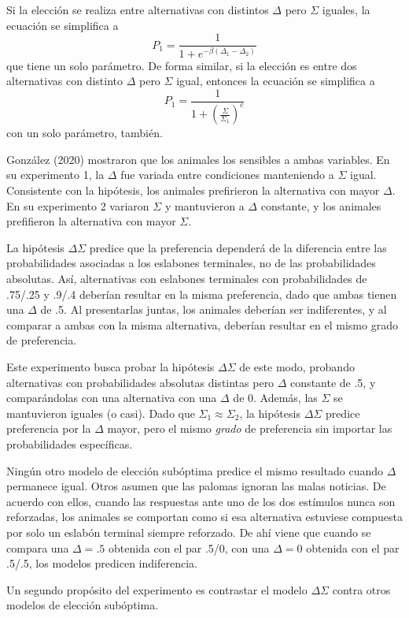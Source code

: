 \documentclass[a4paper,12pt]{article}
\begin{document}
Si la elección se realiza entre alternativas con distintos $\Delta$ pero $\Sigma$ iguales, la ecuación se simplifica a
$$P_1=\frac{1}{1+e^{-\beta(\Delta_1-\Delta_2)}}$$
que tiene un solo parámetro. De forma similar, si la elección es entre dos alternativas con distinto $\Delta$ pero $\Sigma$ igual, entonces la ecuación se simplifica a
$$P_1=\frac{1}{1+\left(\frac{\Sigma}{\Sigma_1}\right)^c}$$
con un solo parámetro, también.

González (2020) mostraron que los animales los sensibles a ambas variables. En su experimento 1, la $\Delta$ fue variada entre condiciones manteniendo a $\Sigma$ igual. Consistente con la hipótesis, los animales prefirieron la alternativa con mayor $\Delta$. En su experimento 2 variaron $\Sigma$ y mantuvieron a $\Delta$ constante, y los animales prefifieron la alternativa con mayor $\Sigma$.

La hipótesis $\Delta\Sigma$ predice que la preferencia dependerá de la diferencia entre las probabilidades asociadas a los eslabones terminales, no de las probabilidades absolutas. Así, alternativas con eslabones terminales con probabilidades de .75/.25 y .9/.4 deberían resultar en la misma preferencia, dado que ambas tienen una $\Delta$ de .5. Al presentarlas juntas, los animales deberían ser indiferentes, y al comparar a ambas con la misma alternativa, deberían resultar en el mismo grado de preferencia.

Este experimento busca probar la hipótesis $\Delta\Sigma$ de este modo, probando alternativas con probabilidades absolutas distintas pero $\Delta$ constante de .5, y comparándolas con una alternativa con una $\Delta$ de 0. Además, las $\Sigma$ se mantuvieron iguales (o casi). Dado que $\Sigma_1\approx\Sigma_2$, la hipótesis $\Delta\Sigma$ predice preferencia por la $\Delta$ mayor, pero el mismo {\slshape grado} de preferencia sin importar las probabilidades específicas.

Ningún otro modelo de elección subóptima predice el mismo resultado cuando $\Delta$ permanece igual. Otros asumen que las palomas ignoran las malas noticias. De acuerdo con ellos, cuando las respuestas ante uno de los dos estímulos nunca son reforzadas, los animales se comportan como si esa alternativa estuviese compuesta por solo un eslabón terminal siempre reforzado. De ahí viene que cuando se compara una $\Delta = {.}5$ obtenida con el par .5/0, con una $\Delta=0$ obtenida con el par .5/.5, los modelos predicen indiferencia.

Un segundo propósito del experimento es contrastar el modelo $\Delta\Sigma$ contra otros modelos de elección subóptima.
\end{document}
